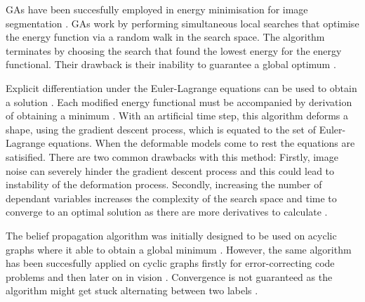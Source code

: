 \begin{definition}
 	GAs have been succesfully employed in energy minimisation for image segmentation \citep{MacEachern1998,Ballerini1999,Ballerini2001,Zeipelt2001,Ibanez2009}.
 	GAs work by performing simultaneous local searches that optimise the energy function via a random walk in the search space.
 	The algorithm terminates by choosing the search that found the lowest energy for the energy functional.
 	Their drawback is their inability to guarantee a global optimum \citep{McIntosh2013}.
\end{definition}

\begin{definition}
	Explicit differentiation under the Euler-Lagrange equations can be used to obtain a solution \citep{McIntosh2013}.
	Each modified energy functional must be accompanied by derivation of obtaining a minimum \citep{Terzopoulos1987,Kass1988,Caselles1997,Chan2001}.
	With an artificial time step, this algorithm deforms a shape, using the gradient descent process, which is equated to the set of Euler-Lagrange equations.
	When the deformable models come to rest the equations are satisified.
	There are two common drawbacks with this method: Firstly, image noise can severely hinder the gradient descent process and this could lead to instability of the  deformation process.
	Secondly, increasing the number of dependant variables increases the complexity of the search space and time to converge to an optimal solution as there are more derivatives to calculate \citep{McIntosh2013}.
\end{definition}

\begin{definition}
	The belief propagation algorithm was initially designed to be used on acyclic graphs  where it able to obtain a global minimum \citep{Pearl1988}.
	However, the same algorithm has been succesfully applied on cyclic graphs firstly for error-correcting code problems \citep{Frey1998} and then later on in vision \citep{Freeman2000}.
	Convergence is not guaranteed as the algorithm might get stuck alternating between two labels \citep{Pearl1988}.
\end{definition}
  
